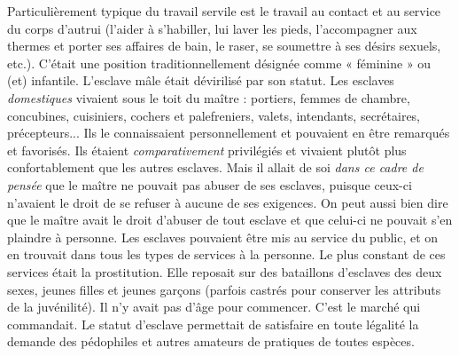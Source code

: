Particulièrement typique du travail servile est le travail au contact
et au service du corps d'autrui (l'aider à s'habiller, lui laver les pieds, l'accompagner
aux thermes et porter ses affaires de bain, le raser, se soumettre
à ses désirs sexuels, etc.). C'était une position traditionnellement désignée
comme « féminine » ou (et) infantile. L'esclave mâle était dévirilisé
par son statut. Les esclaves \emph{domestiques} vivaient sous le toit du maître :
portiers, femmes de chambre, concubines, cuisiniers, cochers et palefreniers,
valets, intendants, secrétaires, précepteurs... Ils le connaissaient
personnellement et pouvaient en être remarqués et favorisés. Ils étaient
\emph{comparativement} privilégiés et vivaient plutôt plus confortablement que les
autres esclaves. Mais il allait de soi \emph{dans ce cadre de pensée} que le maître ne
pouvait pas abuser de ses esclaves, puisque ceux-ci n'avaient le droit de
se refuser à aucune de ses exigences. On peut aussi bien dire que le maître
avait le droit d'abuser de tout esclave et que celui-ci ne pouvait s'en
plaindre à personne. Les esclaves pouvaient être mis au service du public,
et on en trouvait dans tous les types de services à la personne. Le plus
constant de ces services était la prostitution. Elle reposait sur des bataillons
d'esclaves des deux sexes, jeunes filles et jeunes garçons (parfois castrés
pour conserver les attributs de la juvénilité). Il n'y avait pas d'âge
pour commencer. C'est le marché qui commandait. Le statut d'esclave
permettait de satisfaire en toute légalité la demande des pédophiles et autres
amateurs de pratiques de toutes espèces.

